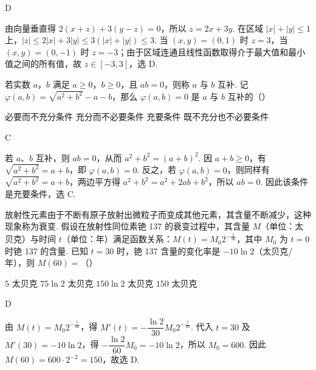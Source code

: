 \begin{answer}
D
\end{answer}

\begin{solution}
由向量垂直得 \(2(x+z)+3(y-z)=0\)，所以 \(z=2x+3y\). 在区域 \(|x|+|y|\leqslant1\) 上，\(|z|\leqslant2|x|+3|y|\leqslant3(|x|+|y|)\leqslant3\). 当 \((x,y)=(0,1)\) 时 \(z=3\)，当 \((x,y)=(0,-1)\) 时 \(z=-3\)；由于区域连通且线性函数取得介于最大值和最小值之间的所有值，故 \(z\in[-3,3]\)，选 D.
\end{solution}

\begin{problem}
若实数 \(a\)，\(b\) 满足 \(a\geqslant0\)，\(b\geqslant0\)，且 \(ab=0\)，则称 \(a\) 与 \(b\) 互补. 记 \(\varphi(a,b)=\sqrt{a^2+b^2}-a-b\)，那么 \(\varphi(a,b)=0\) 是 \(a\) 与 \(b\) 互补的（\quad）

\choices
    {必要而不充分条件}
    {充分而不必要条件}
    {充要条件}
    {既不充分也不必要条件}
\end{problem}

\begin{answer}
C
\end{answer}

\begin{solution}
若 \(a\)、\(b\) 互补，则 \(ab=0\)，从而 \(a^2+b^2=(a+b)^2\). 因 \(a+b\geqslant0\)，有 \(\sqrt{a^2+b^2}=a+b\)，即 \(\varphi(a,b)=0\). 反之，若 \(\varphi(a,b)=0\)，则同样有 \(\sqrt{a^2+b^2}=a+b\)，两边平方得 \(a^2+b^2=a^2+2ab+b^2\)，所以 \(ab=0\). 因此该条件是充要条件，选 C.
\end{solution}

\begin{problem}
放射性元素由于不断有原子放射出微粒子而变成其他元素，其含量不断减少，这种现象称为衰变. 假设在放射性同位素铯 137 的衰变过程中，其含量 \(M\)（单位：太贝克）与时间 \(t\)（单位：年）满足函数关系：\(M(t)=M_0 2^{-\frac{t}{30}}\)，其中 \(M_0\) 为 \(t=0\) 时铯 137 的含量. 已知 \(t=30\) 时，铯 137 含量的变化率是 \(-10\ln2\)（太贝克/年），则 \(M(60)=\)（\quad）

\choices
    {\(5\text{ 太贝克}\)}
    {\(75\ln2\text{ 太贝克}\)}
    {\(150\ln2\text{ 太贝克}\)}
    {\(150\text{ 太贝克}\)}
\end{problem}

\begin{answer}
D
\end{answer}

\begin{solution}
由 \(M(t)=M_0 2^{-\frac{t}{30}}\)，得 \(M'(t)=-\dfrac{\ln2}{30}M_0 2^{-\frac{t}{30}}\). 代入 \(t=30\) 及 \(M'(30)=-10\ln2\)，得 \(-\dfrac{\ln2}{60}M_0=-10\ln2\)，所以 \(M_0=600\). 因此 \(M(60)=600\cdot2^{-2}=150\)，故选 D.
\end{solution}

